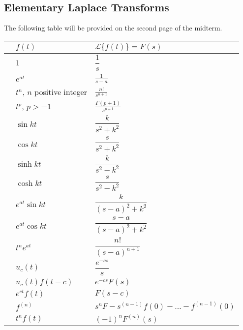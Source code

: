\documentclass[12pt]{exam}
\begin{document}
    

        


\newpage

\subsection*{Elementary Laplace Transforms}

The following table will be provided on the second page of the midterm. 

\newcommand{\LTNUM}{\stepcounter{NumberInTable}{(\theNumberInTable)}}

\vspace{-0ex}
    \renewcommand{\arraystretch}{2.1}
    \begin{center}
    \begin{tabular}{ p{1cm} p{4cm} p{6cm} }
        & $f(t)$ & $\mathcal  L\{f(t)\}  =F(s)$ \\ \hline
        \LTNUM & $1$ & $\displaystyle \dfrac{1}{s}$  \\ 
        \LTNUM & $e^{at}$	& $\displaystyle \frac{1}{s-a}$ \\ 
        \LTNUM & $t^n$, $n$ positive integer	& $\displaystyle \frac{n!}{s^{n+1}}$  \\ 
        \LTNUM & $t^p$, $p > -1$	& $\displaystyle \frac{\Gamma(p+1)}{s^{p+1}}$  \\ 
        \LTNUM &$\sin kt$ 	& $\displaystyle \dfrac{k}{s^2+k^2}$ \\ 
        \LTNUM &$\cos kt$ 	& $\displaystyle \dfrac{s}{s^2+k^2}$ \\ 
        \LTNUM &$\sinh kt$	& $\displaystyle \dfrac{k}{s^2-k^2}$ \\ 
        \LTNUM &$\cosh kt$	& $\displaystyle \dfrac{s}{s^2-k^2}$ \\ 
        \LTNUM &$e^{at}\sin kt$	& $\displaystyle \dfrac{k}{(s-a)^2+k^2}$   \\ 
        \LTNUM &$e^{at}\cos kt$	& $\displaystyle \dfrac{s-a}{(s-a)^2+k^2}$  \\ 
        \LTNUM &$t^ne^{at}$	& $\displaystyle \dfrac{n!}{(s-a)^{n+1}}$  \\ 
        \LTNUM &$u_c(t)$	& $\displaystyle \dfrac{e^{-cs}}{s}$  \\ 
        \LTNUM &$u_c(t)f(t-c)$& $\displaystyle e^{-cs}F(s)$  \\ 
        \LTNUM &$e^{ct}f(t)$& $\displaystyle F(s-c)$  \\ 
        \LTNUM &$f^{(n)}$& $\displaystyle s^nF-s^{(n-1)}f(0) - \ldots -f^{(n-1)}(0)$  \\ 
        \LTNUM & $t^n f(t)$& $\displaystyle (-1)^nF^{(n)}(s)$  \\ 
    \end{tabular}
    \renewcommand{\arraystretch}{.5}

\end{center}
\end{document}
